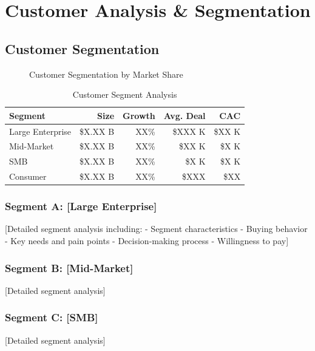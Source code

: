 \documentclass[11pt,letterpaper]{report}
\begin{document}
\chapter{Customer Analysis \& Segmentation}

\section{Customer Segmentation}


\begin{figure}[htbp]
\centering
\caption{Customer Segmentation by Market Share}
\label{fig:customer_segments}
\end{figure}

\begin{table}[htbp]
\centering
\caption{Customer Segment Analysis}
\begin{tabular}{@{}lrrrr@{}}
\toprule
\textbf{Segment} & \textbf{Size} & \textbf{Growth} & \textbf{Avg. Deal} & \textbf{CAC} \\
\midrule
Large Enterprise & \$X.XX B & XX\% & \$XXX K & \$XX K \\
\rowcolor{tablealt} Mid-Market & \$X.XX B & XX\% & \$XX K & \$X K \\
SMB & \$X.XX B & XX\% & \$X K & \$X K \\
\rowcolor{tablealt} Consumer & \$X.XX B & XX\% & \$XXX & \$XX \\
\bottomrule
\end{tabular}
\label{tab:customer_segments}
\end{table}

\subsection{Segment A: [Large Enterprise]}
[Detailed segment analysis including:
- Segment characteristics
- Buying behavior
- Key needs and pain points
- Decision-making process
- Willingness to pay]

\subsection{Segment B: [Mid-Market]}
[Detailed segment analysis]

\subsection{Segment C: [SMB]}
[Detailed segment analysis]
\end{document}
